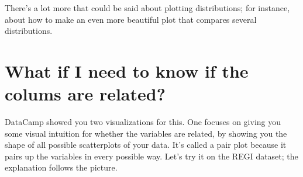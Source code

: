 \documentclass[letterpaper,10pt,english]{jupyterBook}
\begin{document}
\begin{sphinxVerbatim}[commandchars=\\\{\}]
       
 \PYG{p}{[}\PYG{p}{]}     
 \PYG{p}{[}\PYG{p}{]}     
\end{sphinxVerbatim}

\noindent{}

\sphinxAtStartPar
There’s a lot more that could be said about plotting distributions; for instance,  about how to make an even more beautiful plot that compares several distributions.


\section{What if I need to know if the colums are related?}
\label{\detokenize{chapter-10-visualization:what-if-i-need-to-know-if-the-colums-are-related}}
\sphinxAtStartPar
DataCamp showed you two visualizations for this.  One focuses on giving you some visual intuition for whether the variables are related, by showing you the shape of all possible scatterplots of your data.  It’s called a pair plot because it pairs up the variables in every possible way.  Let’s try it on the REGI dataset; the explanation follows the picture.
\end{document}
